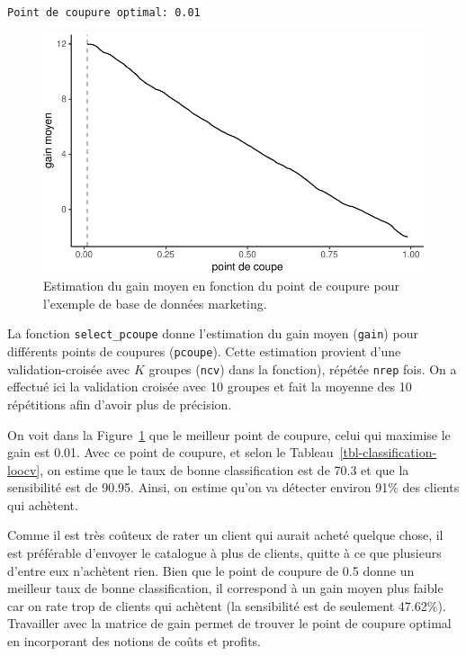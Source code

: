 \documentclass[
  11pt,
  letterpaper,
]{book}
\theoremstyle{definition}
\theoremstyle{remark}
\begin{document}
\begin{verbatim}
Point de coupure optimal: 0.01 
\end{verbatim}

\begin{figure}[ht!]

{\centering \includegraphics{./05-reglogistique_files/figure-pdf/fig-coupure-pondere-1.pdf}

}

\caption{\label{fig-coupure-pondere}Estimation du gain moyen en fonction
du point de coupure pour l'exemple de base de données marketing.}

\end{figure}

La fonction \texttt{select\_pcoupe} donne l'estimation du gain moyen
(\texttt{gain}) pour différents points de coupures (\texttt{pcoupe}).
Cette estimation provient d'une validation-croisée avec \(K\) groupes
(\texttt{ncv}) dans la fonction), répétée \texttt{nrep} fois. On a
effectué ici la validation croisée avec 10 groupes et fait la moyenne
des 10 répétitions afin d'avoir plus de précision.

On voit dans la Figure~\ref{fig-coupure-pondere} que le meilleur point
de coupure, celui qui maximise le gain est 0.01. Avec ce point de
coupure, et selon le Tableau~\ref{tbl-classification-loocv}, on estime
que le taux de bonne classification est de 70.3 et que la sensibilité
est de 90.95. Ainsi, on estime qu'on va détecter environ 91\% des
clients qui achètent.

Comme il est très coûteux de rater un client qui aurait acheté quelque
chose, il est préférable d'envoyer le catalogue à plus de clients,
quitte à ce que plusieurs d'entre eux n'achètent rien. Bien que le point
de coupure de 0.5 donne un meilleur taux de bonne classification, il
correspond à un gain moyen plus faible car on rate trop de clients qui
achètent (la sensibilité est de seulement 47.62\%). Travailler avec la
matrice de gain permet de trouver le point de coupure optimal en
incorporant des notions de coûts et profits.
\end{document}
